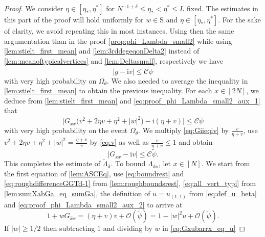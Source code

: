 \documentclass[11pt]{article}
\newcommand{\ii}{\mathrm{i}}
\newcommand{\abs}[1]{\left| #1 \right|}
\theoremstyle{plain}
\theoremstyle{remark}
\numberwithin{equation}{section}
\newcommand*\ubarr[1]{{\widehat{#1}}}
\newcommand{\nc}{\normalcolor}
\begin{document}
	\begin{proof}
		We consider $\eta \in [\eta_{\ast},\eta^{\ast}]$ for $N^{-1+\delta} \le \eta_{\ast} < \eta^{\ast} \le L$ fixed. The estimates in this part of the proof will hold uniformly for $w \in \mathrm{S}$ and $\eta \in [\eta_*,\eta^*]$. For the sake of clarity, we avoid repeating this in most instances. Using then the same argumentation than in the proof \cref{prop:phi_Lambda_small2}  while using \cref{lem:stielt_first_mean} and \cref{lem:3rddegeqonDelta2} instead of \cref{lem:meanoftypicalvertices} and \cref{lem:Deltasmall}, respectively we have
		\begin{equation} \label{eq:proof_phi_Lambda_small2_aux_1} 
			\abs{g - \ii v } \leq \mathcal C \widetilde{\psi}
		\end{equation} 
		with very high probability on $\Omega_\theta$. We also needed to average the inequality in \cref{lem:stielt_first_mean} to obtain the previous inequality.
		For each $x \in [2N]$, we deduce from \cref{lem:stielt_first_mean} and \eqref{eq:proof_phi_Lambda_small2_aux_1} that \nc 
		\begin{equation}\label{eq:Giieqiv}
			\bigl|G_{xx} \bigl( v^2  +2 \eta v + \eta^2 + \abs{w}^2 \bigr) -  \ii (\eta + v) \bigr| \le  \mathcal{C} \widetilde{\psi}
		\end{equation}
		with very high probability on the event $\Omega_{\theta}$. We multiply \eqref{eq:Giieqiv} by $\frac{v}{\eta + v}$, use $v^2  +2 \eta v + \eta^2 + \abs{w}^2= \frac{\eta + v}{v}$ by \eqref{eq:v} as well as $\frac{v}{\eta + v} \leq 1$ and obtain 
		\begin{equation}\label{eq:proof_phi_Lambda_small2_aux_2} 
			|G_{xx} - \ii v | \le \mathcal C \widetilde{\psi}.
		\end{equation}
		This completes the estimate of $\tilde{\Lambda}_{\mathrm{d}}$.	To bound $ \Lambda_{\mathrm{do}}$, 
		let $x \in [N]$. We start from the first equation of \cref{lem:ASCEq}, use \eqref{eq:boundrest} and \eqref{eq:roughdifferenceGGTd-1} from \cref{lem:roughboundsrest}, \eqref{eq:all_vert_typi} from \cref{lem:sumXabGa_eq_sumGa}, the definition of $u=u_{(1,1)}$ from \eqref{eq:def_u_beta} and \eqref{eq:proof_phi_Lambda_small2_aux_2} to arrive at 
		\begin{equation}
			1 + w G_{\ubarr{x}x} = ( \eta +  v) v + \mathcal O ( \widetilde{\psi}) 
			=1 - \abs{w}^2 u + \mathcal O ( \widetilde{\psi}).\label{eq:Gxubarrx_eq_u}
		\end{equation}
		If $\abs{w} \geq 1/2$ then subtracting $1$ and dividing by $w$ in \eqref{eq:Gxubarrx_eq_u} 

\end{proof}
\end{document}
